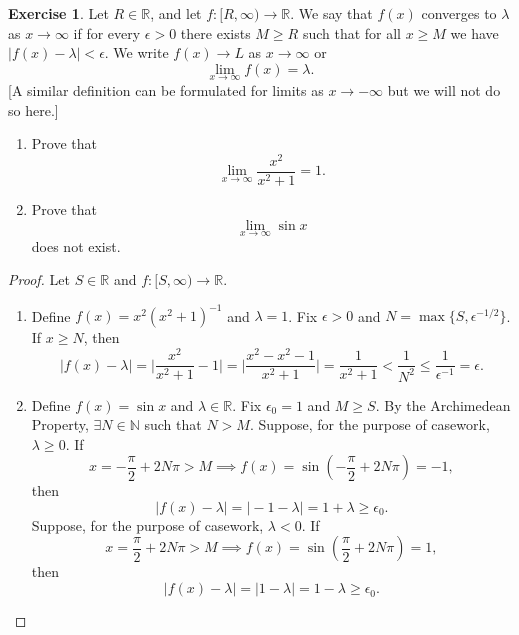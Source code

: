 \documentclass[12pt]{article}
\theoremstyle{definition}
\newtheorem{exercise}{Exercise}
\begin{document}
\begin{exercise}
    Let \(R \in \mathbb{R}\), and let \(f : [R, \infty) \to \mathbb{R}\). We say that \(f(x)\) converges to \(\lambda\) as \(x \to \infty\) if for every \(\epsilon > 0\) there exists \(M \geq R\) such that for all \(x \geq M\) we have \(\vert f(x) - \lambda \vert < \epsilon\). We write \(f(x) \to L\) as \(x \to \infty\) or
    \[
        \lim_{x \to \infty}f(x) = \lambda.
    \]
    [A similar definition can be formulated for limits as \(x \to -\infty\) but we will not do so here.]
    \begin{enumerate}[label=(\alph*)]
        \item Prove that
        \[
            \lim_{x \to \infty}\frac{x^2}{x^2 + 1} = 1.
        \]
        \item Prove that
        \[
            \lim_{x \to \infty}\sin x
        \]
        does not exist.
    \end{enumerate}
\end{exercise}

\begin{proof}
    Let \(S \in \mathbb{R}\) and \(f : [S, \infty) \to \mathbb{R}\).
    \begin{enumerate}[label=(\alph*)]
        \item Define \(f(x) = x^2(x^2 + 1)^{-1}\) and \(\lambda = 1\). Fix \(\epsilon > 0\) and \(N = \max\{S,\epsilon^{-1 / 2}\}\). If \(x \geq N\), then
        \[
            \vert f(x) - \lambda \vert = \bigg\vert \frac{x^2}{x^2 + 1} - 1 \bigg\vert = \bigg\vert \frac{x^2 - x^2 - 1}{x^2 + 1} \bigg\vert = \frac{1}{x^2 + 1} < \frac{1}{N^2} \leq \frac{1}{\epsilon^{-1}} = \epsilon.
        \]
        \item Define \(f(x) = \sin x\) and \(\lambda \in \mathbb{R}\). Fix \(\epsilon_0 = 1\) and \(M \geq S\). By the Archimedean Property, \(\exists N \in \mathbb{N}\) such that \(N > M\). Suppose, for the purpose of casework, \(\lambda \geq 0\). If
        \[
            x = -\frac{\pi}{2} + 2N\pi > M \implies f(x) = \sin\left(-\frac{\pi}{2} + 2N\pi\right) = -1,
        \]
        then
        \[
            \vert f(x) - \lambda \vert = \vert -1 - \lambda \vert = 1 + \lambda \geq \epsilon_0.  
        \]
        Suppose, for the purpose of casework, \(\lambda < 0\). If 
        \[
            x = \frac{\pi}{2} + 2N\pi > M \implies f(x) = \sin\left(\frac{\pi}{2} + 2N\pi\right) = 1,
        \]
        then
        \[
            \vert f(x) - \lambda \vert = \vert 1 - \lambda \vert = 1 - \lambda \geq \epsilon_0.
        \]
    \end{enumerate}
\end{proof}
\end{document}
